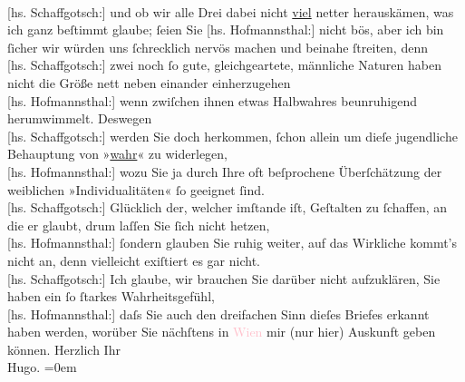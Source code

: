                         {\\}{[}hs. Schaffgotsch:{]} und ob wir alle Drei dabei nicht \uline{viel} netter herauskämen, was ich ganz beſtimmt glaube;
                    ſeien Sie \pend
           \pstart
           {\pb}{[}hs. Hofmannsthal:{]} nicht bös, aber ich bin ſicher wir würden uns { }ſchrecklich nervös machen und beinahe ſtreiten,
                    denn {\\}{[}hs. Schaffgotsch:{]} zwei noch ſo gute, gleichgeartete, männliche
                    Naturen haben nicht die Größe nett neben einander einherzugehen {\\}{[}hs. Hofmannsthal:{]} wenn zwiſchen ihnen etwas Halbwahres beunruhigend
                    herumwimmelt. Deswegen {\\}{[}hs. Schaffgotsch:{]} werden Sie doch herkommen,
                    ſchon allein um dieſe jugendliche Behauptung von
                        »\uline{wahr}« zu widerlegen, {\\}{[}hs. Hofmannsthal:{]} wozu Sie ja durch Ihre oft beſprochene Überſchätzung der weiblichen
                    »Individualitäten« ſo geeignet ſind. {\\}{[}hs. Schaffgotsch:{]} Glücklich der,
                    welcher imſtande iſt, Geſtalten zu ſchaffen, an die er glaubt, drum laſſen Sie
                    ſich nicht hetzen, {\\}{[}hs. Hofmannsthal:{]} ſondern glauben Sie ruhig weiter,
                    auf das Wirkliche kommt’s nicht an, denn vielleicht exiſtiert es gar nicht.
                        {\\}{[}hs. Schaffgotsch:{]} Ich glaube, wir brauchen Sie darüber nicht
                    aufzuklären, Sie haben ein ſo ſtarkes Wahrheitsgefühl, {\\}{[}hs. Hofmannsthal:{]} daſs Sie auch den dreifachen Sinn dieſes Briefes erkannt
                    haben werden, worüber Sie nächſtens in \textcolor{pink}{Wien}{}\ledrightnote{\textcolor{pink}{Wien}} mir
                    (nur hier) Auskunft geben können.\pend
           \pstart
           Herzlich Ihr{\\[\baselineskip]}\spacefill\mbox{Hugo.}\pend
           \leftskip=0em{}\endnumbering{}  
      